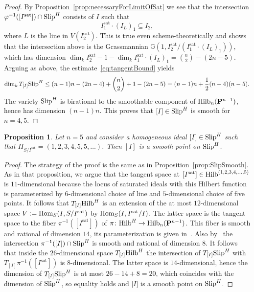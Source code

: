 \documentclass{amsart}
\newcommand{\Hilb}{{\rm{Hilb}}}
\newcommand{\Slip}{{\rm{Slip}}}
\newcommand{\Hom}{{\rm{Hom}}}
\newcommand{\PP}{{\bf P}}
\def\Gr #1#2{{\mathbb G}\left(#1,#2\right)} %
\newcommand{\Hvanilla}{\Hilb_{n}(\PP^{n-1})}
\newcommand{\sat}{\mathrm{sat}}%
\newtheorem{proposition}[lemma]{\bf Proposition}
\begin{document}
\begin{proof}
    By Proposition~\ref{prop:necessaryForLimitOfSat} we see that the intersection
    $\varphi^{-1}([I^{\sat}]) \cap \Slip^H$ consists of $I$ such that
    $$I^{\sat}_1 \cdot (I_{L})_1 \subseteq I_2,$$ where $L$ is the line in $V(I^{\sat}_2)$. This is true even
    scheme-theoretically and shows that the intersection above is the
    Grassmannian $\Gr{1}{I^{\sat}_2/(I^{\sat}_1 \cdot (I_{L})_1)}$, which has
    dimension $\dim_{k} I^{\sat}_2 - 1 - \dim_{k} I^{\sat}_1 \cdot (I_{L})_1
    = \binom{n}{2} - (2n-5)$. Arguing as above, the
    estimate~\eqref{eq:tangentBound} yields
    \[
        \dim_{k} T_{[I]} \Slip^H \leq (n-1)n - (2n-4) + \binom{n}{2} + 1 -
        (2n-5) = (n-1)n + \frac{1}{2}(n-4)(n-5).
    \]
    The variety $\Slip^H$ is birational to the smoothable component of
    $\Hvanilla$, hence has dimension $(n-1)n$. This proves that
    $[I]\in \Slip^H$ is smooth for $n=4,5$.
\end{proof}

\begin{proposition}\label{prop:SlipSmoothSecondCase}
    Let $n=5$ and consider a homogeneous ideal $[I]\in \Slip^H$ such that
    $H_{S/I^{\sat}} = (1, 2, 3, 4, 5, 5, \ldots )$. Then $[I]$ is a smooth point on $\Slip^H$.
\end{proposition}
\begin{proof}
    The strategy of the proof is the same as in
    Proposition~\ref{prop:SlipSmooth}. As in that proposition, we argue that
    the tangent space at $[I^{\sat}]\in \Hilb^{(1,2,3,4, \ldots ,5)}$ is
    $11$-dimensional because the locus of saturated ideals with this Hilbert
    function is parameterized by $6$-dimensional choice of line and
    $5$-dimensional choice of five points. It follows that $T_{[I]}\Hilb^H$ is
    an extension of the at most $12$-dimensional space $V := \Hom_S(I, S/I^{\sat})$ by
    $\Hom_S(I, I^{\sat}/I)$. The latter space is the tangent space to the
    fiber $\pi^{-1}([I^{\sat}])$ of $\pi\colon \Hilb^H\to \Hvanilla$. This fiber is smooth and
    rational of dimension $14$, its parameterization is given
    in~\cite[\S4.4.3]{JM}. Also by~\cite[\S4.4.3]{JM} the intersection
    $\pi^{-1}([I])\cap \Slip^H$ is smooth and rational of dimension $8$. It
    follows that inside the $26$-dimensional space $T_{[I]}\Hilb^H$ the
    intersection of
    $T_{[I]} \Slip^H$ with $T_{[I]}\pi^{-1}([I^{\sat}])$ is $8$-dimensional.
    The latter space is $14$-dimensional, hence the dimension of $T_{[I]}\Slip^H$ is at most
    $26 - 14 + 8 =20$, which coincides with the dimension of $\Slip^H$, so equality holds and $|I]$ is a smooth point on $\Slip^H$.
\end{proof}
\end{document}
